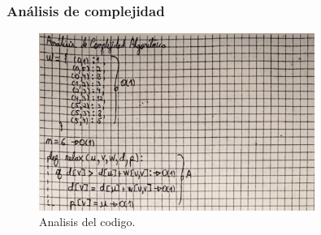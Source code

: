 \subsubsection{Análisis de complejidad}
\begin{figure}[H]
	\centering
	\includegraphics[width=0.8\textwidth]{complejidad_distancia_ejem2_1.png}
	\caption{Analisis del codigo.}
	\label{fig:complejidad1}
\end{figure}

